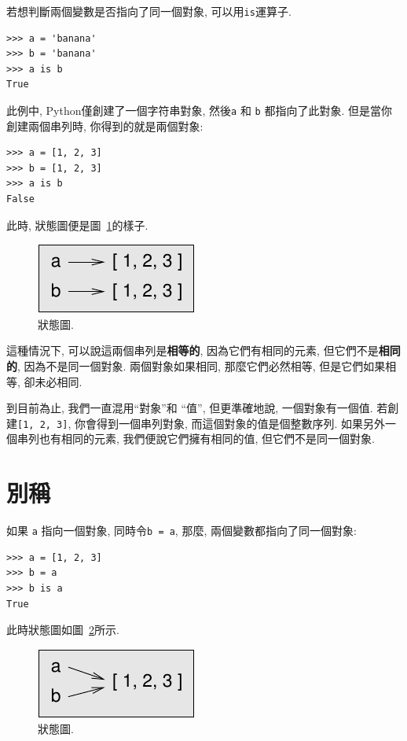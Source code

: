 \documentclass[10pt]{book}
\begin{document}
若想判斷兩個變數是否指向了同一個對象, 可以用{\tt is}運算子.

\begin{verbatim}
>>> a = 'banana'
>>> b = 'banana'
>>> a is b
True
\end{verbatim}
%
此例中, Python僅創建了一個字符串對象, 然後{\tt a} 
和 {\tt b} 都指向了此對象. 
但是當你創建兩個串列時, 你得到的就是兩個對象:

\begin{verbatim}
>>> a = [1, 2, 3]
>>> b = [1, 2, 3]
>>> a is b
False
\end{verbatim}
%

此時, 狀態圖便是圖~\ref{fig.list2}的樣子.

\begin{figure}
\centerline
{\includegraphics[scale=0.8]{figs/list2.pdf}}
\caption{狀態圖.}
\label{fig.list2}
\end{figure}

這種情況下, 可以說這兩個串列是{\bf 相等的},
因為它們有相同的元素, 
但它們不是{\bf 相同的}, 因為不是同一個對象. 
兩個對象如果相同, 那麼它們必然相等, 
但是它們如果相等, 卻未必相同. 

到目前為止, 我們一直混用``對象''和 ``值'', 但更準確地說, 
一個對象有一個值. 若創建{\tt [1, 2, 3]}, 你會得到一個串列對象, 
而這個對象的值是個整數序列. 
如果另外一個串列也有相同的元素, 我們便說它們擁有相同的值, 
但它們不是同一個對象. 


\section{別稱}

如果 {\tt a} 指向一個對象, 同時令{\tt b = a},
那麼, 兩個變數都指向了同一個對象:

\begin{verbatim}
>>> a = [1, 2, 3]
>>> b = a
>>> b is a
True
\end{verbatim}
%
此時狀態圖如圖~\ref{fig.list3}所示.

\begin{figure}
\centerline
{\includegraphics[scale=0.8]{figs/list3.pdf}}
\caption{狀態圖.}
\label{fig.list3}
\end{figure}
\end{document}
